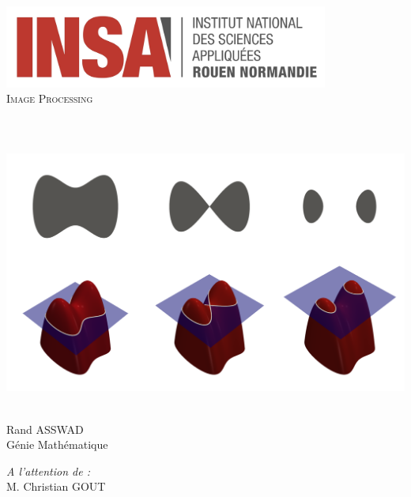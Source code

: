 \begin{titlepage}
    \begin{sffamily}
        \begin{center}
            \includegraphics[width=0.8\textwidth]{img/logo}\\[2cm]

            \textsc{\huge Image Processing}\\[1cm]

            \HRule \\[0.4cm]
            {\huge \bfseries \@title \\[0.4cm]}
            \HRule \\[3cm]

            \includegraphics[width=.9\textwidth]{img/cover_img}~\\[2cm]

            \begin{minipage}{0.4\textwidth}
            \begin{flushleft} \large
                Rand ASSWAD\\
                Génie Mathématique
            \end{flushleft}
            \end{minipage}
            \begin{minipage}{0.4\textwidth}
            \begin{flushright} \large
                \emph{A l'attention de :}\\
                M. Christian GOUT
            \end{flushright}
            \end{minipage}

            \vfill
            {\large \@date}
        \end{center}
    \end{sffamily}
\end{titlepage}
\makeatother
